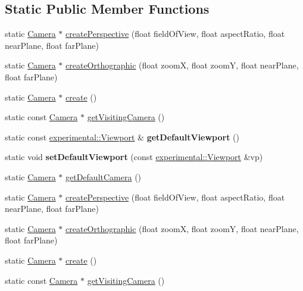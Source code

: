 \subsection*{Static Public Member Functions}
\begin{DoxyCompactItemize}
\item 
static \hyperlink{classCamera}{Camera} $\ast$ \hyperlink{classCamera_af0bba944c9c7a57daa328ef1d038c816}{create\+Perspective} (float field\+Of\+View, float aspect\+Ratio, float near\+Plane, float far\+Plane)
\item 
static \hyperlink{classCamera}{Camera} $\ast$ \hyperlink{classCamera_a70c042a3bf819a0196487374ee566875}{create\+Orthographic} (float zoomX, float zoomY, float near\+Plane, float far\+Plane)
\item 
static \hyperlink{classCamera}{Camera} $\ast$ \hyperlink{classCamera_a21e3aed4000a43486ecba275d1c0d8fb}{create} ()
\item 
static const \hyperlink{classCamera}{Camera} $\ast$ \hyperlink{classCamera_a71a044ac0a08723ac89ca69deb460f47}{get\+Visiting\+Camera} ()
\item 
\mbox{\label{classCamera_a3f46628a43d5b43d300fe34528ddd84a}} 
static const \hyperlink{structexperimental_1_1Viewport}{experimental\+::\+Viewport} \& {\bfseries get\+Default\+Viewport} ()
\item 
\mbox{\label{classCamera_af3cd6db622097ab3e6cf2365c357d5d8}} 
static void {\bfseries set\+Default\+Viewport} (const \hyperlink{structexperimental_1_1Viewport}{experimental\+::\+Viewport} \&vp)
\item 
static \hyperlink{classCamera}{Camera} $\ast$ \hyperlink{classCamera_a09ad48ff40729017059d26b2e3363fd1}{get\+Default\+Camera} ()
\item 
static \hyperlink{classCamera}{Camera} $\ast$ \hyperlink{classCamera_a2a51d159d55706e8c4ad99542b9ab232}{create\+Perspective} (float field\+Of\+View, float aspect\+Ratio, float near\+Plane, float far\+Plane)
\item 
static \hyperlink{classCamera}{Camera} $\ast$ \hyperlink{classCamera_a4301bf7716b70f89172e381219f5eb73}{create\+Orthographic} (float zoomX, float zoomY, float near\+Plane, float far\+Plane)
\item 
static \hyperlink{classCamera}{Camera} $\ast$ \hyperlink{classCamera_a4807fdb4627c172d91db44af90a0b390}{create} ()
\item 
static const \hyperlink{classCamera}{Camera} $\ast$ \hyperlink{classCamera_a05d272fef59bf6a8bac284d12095b443}{get\+Visiting\+Camera} ()

\end{DoxyCompactItemize}
